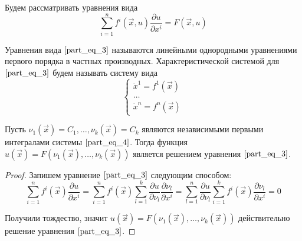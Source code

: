 \documentclass[a4paper, 12pt]{article}
\begin{document}
    Будем рассматривать уравнения вида
    \begin{equation}
        \sum \limits_{i = 1}^{n} f^{i} (\overrightarrow{x}, u) \frac{\partial u}{\partial x^{i}} = F(\overrightarrow{x}, u)
        \label{part_eq_3}
    \end{equation}

    \begin{definition}
        Уравнения вида $\ref{part_eq_3}$ называются линейными однородными уравнениями первого порядка в частных производных. Характеристической системой для $\ref{part_eq_3}$ будем называть систему вида
        \begin{equation}
            \begin{cases}
                \dot{x}^1 = f^1(\overrightarrow{x}) \\
                \dots                                  \\
                \dot{x}^n = f^n(\overrightarrow{x})
            \end{cases}
            \label{part_eq_4}
        \end{equation}
    \end{definition}

    \begin{theorem}
        Пусть $\nu_1(\overrightarrow{x}) = C_1, \dots, \nu_k(\overrightarrow{x}) = C_k$ являются независимыми первыми интегралами системы $\ref{part_eq_4}$. Тогда функция $u(\overrightarrow{x}) = F(\nu_1(\overrightarrow{x}), \dots, \nu_k(\overrightarrow{x}))$ является решением уравнения $\ref{part_eq_3}$.
    \end{theorem}
    \begin{proof}
        Запишем уравнение $\ref{part_eq_3}$ следующим способом:
        \begin{equation*}
            \sum \limits_{i = 1}^{n} f^{i} (\overrightarrow{x}) \frac{\partial u}{\partial x^{i}} = \sum \limits_{i = 1}^{n} f^{i} (\overrightarrow{x}) \sum \limits_{l = 1}^{k} \frac{\partial u}{\partial \nu_l} \frac{\partial \nu_l}{\partial x^{i}} = \sum \limits_{l = 1}^{n} \frac{\partial u}{\partial \nu_l} \sum \limits_{i = 1}^{k} f^{i} (\overrightarrow{x}) \frac{\partial \nu_l}{\partial x^{i}} = 0
        \end{equation*}

        Получили тождество, значит $u(\overrightarrow{x}) = F(\nu_1(\overrightarrow{x}), \dots, \nu_k(\overrightarrow{x}))$ действительно решение уравнения $\ref{part_eq_3}$.
    \end{proof}
\end{document}
